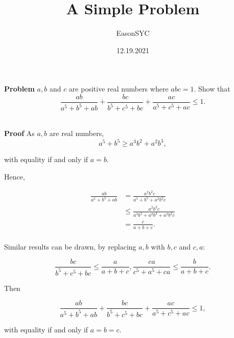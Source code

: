 \documentclass[8pt]{article}
\author{EasonSYC}
\title{A Simple Problem}
\date{12.19.2021}
\begin{document}
	\maketitle

	\textbf{Problem} $a, b$ and $c$ are positive real numbers where $abc=1$. Show that $$\frac{ab}{a^5+b^5+ab}+\frac{bc}{b^5+c^5+bc}+\frac{ac}{a^5+c^5+ac} \leq 1.$$

	~\\

	\textbf{Proof} As $a, b$ are real numbers, $$a^5 + b^5 \geq a^3 b^2 + a^2 b^3, $$

	with equality if and only if $a=b$.

	Hence,

	\begin{align*}
		\frac{ab}{a^5 + b^5 + ab} &= \frac{a^2 b^2 c}{a^5 + b^5 + a^2 b^2 c} \\
		&\leq \frac{a^2 b^2 c}{a^3 b^2 + a^2 b^3 + a^2 b^2 c}\\
		&= \frac{c}{a + b + c}.\\
	\end{align*}

	Similar results can be drawn, by replacing $a, b$ with $b, c$ and $c, a$:

	$$\frac{bc}{b^5 + c^5 + bc} \leq \frac{a}{a + b + c}, \frac{ca}{c^5 + a^5 + ca} \leq \frac{b}{a + b + c}.$$

	Then

	$$\frac{ab}{a^5+b^5+ab}+\frac{bc}{b^5+c^5+bc}+\frac{ac}{a^5+c^5+ac} \leq 1,$$

	with equality if and only if $a=b=c$.
\end{document}
